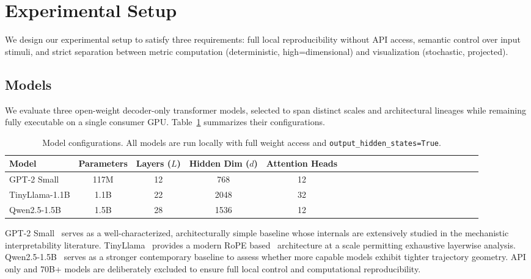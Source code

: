 \documentclass{article}
\begin{document}
\section{Experimental Setup}
\label{sec:experimental_setup}

We design our experimental setup to satisfy three requirements: full local reproducibility without API access, semantic control over input stimuli, and strict separation between metric computation (deterministic, high=dimensional) and visualization (stochastic, projected).

\subsection{Models}
\label{subsec:models}

We evaluate three open-weight decoder-only transformer models, selected to span distinct scales and architectural lineages while remaining fully executable on a single consumer GPU. Table~\ref{tab:models} summarizes their configurations.

\begin{table}[htbp]
\centering
\caption{Model configurations. All models are run locally with full weight access and \texttt{output\_hidden\_states=True}.}
\label{tab:models}
\small{
\begin{tabular}{lcccccccccccccccccccc}
\toprule
\textbf{Model} & \textbf{Parameters} & \textbf{Layers ($L$)} 
    & \textbf{Hidden Dim ($d$)} & \textbf{Attention Heads} \\
\midrule
GPT-2 Small        & 117M  & 12 & 768  & 12 \\
TinyLlama-1.1B     & 1.1B  & 22 & 2048 & 32 \\
Qwen2.5-1.5B       & 1.5B  & 28 & 1536 & 12 \\
\bottomrule
\end{tabular}}
\end{table}

GPT-2 Small~\cite{radford2019language} serves as a well-characterized, architecturally simple baseline whose internals are extensively studied in the mechanistic interpretability literature. TinyLlama~\cite{zhang2024tinyllama} provides a modern RoPE based~\cite{su2024roformer} architecture at a scale permitting exhaustive layerwise analysis. Qwen2.5-1.5B~\cite{qwen2025qwen25} serves as a stronger contemporary baseline to assess whether more capable models exhibit tighter trajectory geometry. API only and 70B+ models are deliberately excluded to ensure full local control and computational reproducibility.
\end{document}
